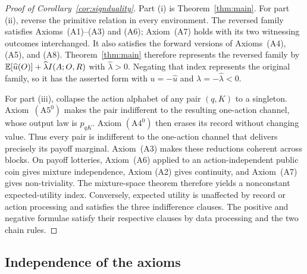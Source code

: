 \begin{proof}[Proof of Corollary~\ref{cor:signduality}]
Part \textup{(i)} is Theorem~\ref{thm:main}.  For part \textup{(ii)}, reverse
the primitive relation in every environment.  The reversed family satisfies
Axioms~\textup{(A1)--(A3)} and \textup{(A6)}; Axiom~\textup{(A7)} holds with
its two witnessing outcomes interchanged.  It also satisfies the forward
versions of Axioms~\textup{(A4)}, \textup{(A5)}, and
\textup{(A8)}.  Theorem~\ref{thm:main} therefore represents the reversed
family by
\(
  \mathbb E[\widehat u(O)]+\widehat\lambda I(A;O,R)
\)
with \(\widehat\lambda>0\).  Negating that index represents the original
family, so it has the asserted form with
\(u=-\widehat u\) and \(\lambda=-\widehat\lambda<0\).

For part \textup{(iii)}, collapse the action alphabet of any pair $(q,K)$ to
a singleton.  Axiom~$(\mathrm A5^0)$ makes the pair indifferent to the
resulting one-action channel, whose output law is $p_{qK}$.  Axiom
$(\mathrm A4^0)$ then erases its record without changing value.  Thus every
pair is indifferent to the one-action channel that delivers precisely its
payoff marginal.  Axiom~\textup{(A3)} makes these reductions coherent across
blocks.  On payoff lotteries, Axiom~\textup{(A6)} applied to an
action-independent public coin gives mixture independence, Axiom
\textup{(A2)} gives continuity, and Axiom~\textup{(A7)} gives
non-triviality.  The mixture-space theorem therefore yields a nonconstant
expected-utility index.  Conversely, expected utility is unaffected by record
or action processing and satisfies the three indifference clauses.  The
positive and negative formulae satisfy their respective clauses by data
processing and the two chain rules.
\end{proof}

\subsection{Independence of the axioms}

